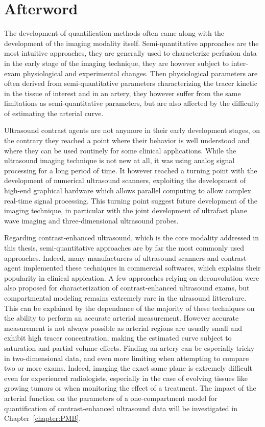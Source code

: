 \chapter*{Afterword}
The development of quantification methods often came along with the development of the imaging modality itself.
Semi-quantitative approaches are the most intuitive approaches, they are generally used to characterize perfusion data in the early stage of the imaging technique, they are however subject to inter-exam physiological and experimental changes.
Then physiological parameters are often derived from semi-quantitative parameters characterizing the tracer kinetic in the tissue of interest and in an artery, they however suffer from the same limitations as semi-quantitative parameters, but are also affected by the difficulty of estimating the arterial curve.

Ultrasound contrast agents are not anymore in their early development stages, on the contrary they reached a point where their behavior is well understood and where they can be used routinely for some clinical applications. 
While the ultrasound imaging technique is not new at all, it was using analog signal processing for a long period of time.
It however reached a turning point with the development of numerical ultrasound scanners, exploiting the development of high-end graphical hardware which allows parallel computing to allow complex real-time signal processing.
This turning point suggest future development of the imaging technique, in particular with the joint development of ultrafast plane wave imaging and three-dimensional ultrasound probes.

Regarding contrast-enhanced ultrasound, which is the core modality addressed in this thesis, semi-quantitative approaches are by far the most commonly used approaches.
Indeed, many manufacturers of ultrasound scanners and contrast-agent implemented these techniques in commercial softwares, which explains their popularity in clinical appication.
A few approaches relying on deconvolution were also proposed for characterization of contrast-enhanced ultrasound exams, but compartmental modeling remains extremely rare in the ulrasound litterature.
This can be explained by the dependance of the majority of these techniques on the ability to perform an accurate arterial measurement. 
However accurate measurement is not always possible as arterial regions are usually small and exhibit high tracer concentration, making the estimated curve subject to saturation and partial volume effects.
Finding an artery can be especially tricky in two-dimensional data, and even more limiting when attempting to compare two or more exams.
Indeed, imaging the exact same plane is extremely difficult even for experienced radiologists, especially in the case of evolving tissues like growing tumors or when monitoring the effect of a treatment.
The impact of the arterial function on the parameters of a one-compartment model for quantification of contrast-enhanced ultrasound data will be investigated in Chapter~\ref{chapter:PMB}.

